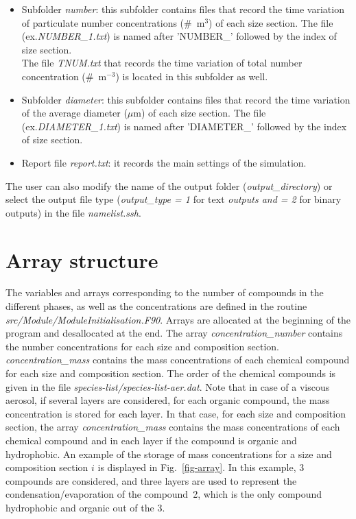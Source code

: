 \documentclass[a4paper,11pt]{article}
\begin{document}
\begin{itemize}
	\item Subfolder {\it{number}}: this subfolder contains files that record the time variation of particulate number concentrations ($\#$~m$^3$) of each size section. The file (ex.\textit{NUMBER\_1.txt}) is named after 'NUMBER\_' followed by the index of size section. \\ The file \textit{TNUM.txt} that records the time variation of total number concentration ($\#$~m$^{-3}$) is located in this subfolder as well.
	
	\item Subfolder {\it{diameter}}: this subfolder contains files that record the time variation of the average diameter ($\mu$m) of each size section. The file (ex.\textit{DIAMETER\_1.txt}) is named after 'DIAMETER\_' followed by the index of size section.
	
	\item Report file {\it{report.txt}}: it records the main settings of the simulation.
\end{itemize}
The user can also modify the name of the output folder ({\it{output\_directory}}) or select the output file type ({\it{output\_type = 1}} for text {\it{outputs and = 2}} for binary outputs) in the file \textit{namelist.ssh}.

\section{Array structure}

The variables and arrays corresponding to the number of compounds in the different
phases, as well as the concentrations are defined in the routine
{\textit{src/Module/ModuleInitialisation.F90}}. Arrays are allocated at the
beginning of the program and desallocated at the end. The array
\textit{concentration\_number} contains the number concentrations for each size
and composition section. \textit{concentration\_mass} contains the mass
concentrations of each chemical compound for each size
and composition section. The order of the chemical compounds is given in the
file \textit{species-list/species-list-aer.dat}. Note that in case of a
viscous aerosol, if several layers are considered, for each organic
compound, the mass concentration is stored for each layer. In that case, for each
size and composition section, the array \textit{concentration\_mass} contains
the mass concentrations of each chemical compound and in each layer if the
compound is organic and hydrophobic. An example of the storage of mass concentrations for a size and composition section $i$ is displayed in Fig.~\ref{fig-array}. In this example, 3 compounds are considered, and three layers are used to represent the condensation/evaporation of the compound~2, which is the only compound hydrophobic and organic out of the 3.
\end{document}
